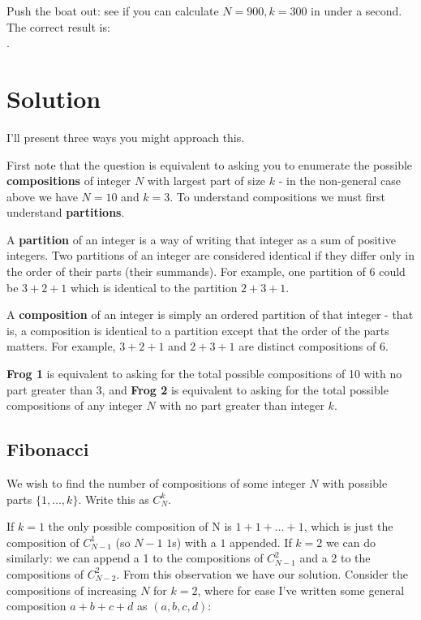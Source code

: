 \documentclass[hidelinks]{article}
\begin{document}
Push the boat out: see if you can calculate $N=900, k=300$ in under a second. The correct result is: \\

.



\newpage


\section{Solution}

I'll present three ways you might approach this. 

First note that the question is equivalent to asking you to enumerate the possible \textbf{compositions} of integer $N$ with largest part of size $k$ - in the non-general case above we have $N=10$ and $k=3$.  To understand compositions we must first understand \textbf{partitions}.

A \textbf{partition} of an integer is a way of writing that integer as a sum of positive integers. Two partitions of an integer are considered identical if they differ only in the order of their parts (their summands). For example, one partition of 6 could be $3+2+1$ which is identical to the partition $2+3+1$.

A \textbf{composition} of an integer is simply an ordered partition of that integer - that is, a composition is identical to a partition except that the order of the parts matters. For example, $3+2+1$ and $2+3+1$ are distinct compositions of 6. 

\textbf{Frog 1} is equivalent to asking for the total possible compositions of 10 with no part greater than 3, and \textbf{Frog 2} is equivalent to asking for the total possible compositions of any integer $N$ with no part greater than integer $k$.


\subsection{Fibonacci}

We wish to find the number of compositions of some integer $N$ with possible parts $\{1,\dots,k\}$. Write this as $C_N^k$.

If $k=1$ the only possible composition of N is $1+1+\dots+1$, which is just the composition of $C_{N-1}^1$ (so $N-1$ $1$s) with a $1$ appended.  If $k=2$ we can do similarly: we can append a 1 to the compositions of $C_{N-1}^2$ and a 2 to the compositions of $C_{N-2}^2$. From this observation we have our solution.  Consider the compositions of increasing $N$ for $k=2$, where for ease I've written some general composition $a+b+c+d$ as $(a,b,c,d)$:
\end{document}
